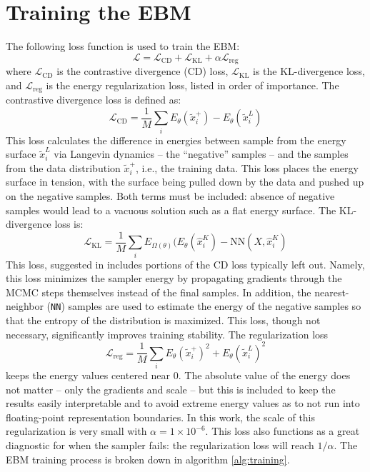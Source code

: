 \section{Training the EBM}
The following loss function is used to train the EBM:
\begin{equation}
	\mathcal{L} = \mathcal{L}_\text{CD} + \mathcal{L}_\text{KL} + \alpha \mathcal{L}_\text{reg}
\end{equation}
where $\mathcal{L}_\text{CD}$ is the contrastive divergence (CD) loss, $\mathcal{L}_\text{KL}$ is the KL-divergence loss, and $\mathcal{L}_\text{reg}$ is the energy regularization loss, listed in order of importance.
The contrastive divergence loss is defined as:
\begin{equation}
	\mathcal{L}_\text{CD} = \frac{1}{M} \sum_i E_\theta(\tilde{x}_{i}^+) - E_\theta(\tilde{x}_{i}^L)
\end{equation}
This loss calculates the difference in energies between sample from the energy surface $\tilde{x}_{i}^L$ via Langevin dynamics -- the ``negative'' samples -- and the samples from the data distribution $\tilde{x}_{i}^+$, i.e., the training data. This loss places the energy surface in tension, with the surface being pulled down by the data and pushed up on the negative samples. Both terms must be included: absence of negative samples would lead to a vacuous solution such as a flat energy surface.
The KL-divergence loss is:
\begin{equation}
	\mathcal{L}_\text{KL} = \frac{1}{M} \sum_i E_{\Omega(\theta)}(E_\theta(\hat{x}_{i}^K) - \text{NN}(X, \hat{x}_{i}^K)
\end{equation}
This loss, suggested in \cite{du_improved_2021} includes portions of the CD loss typically left out. Namely, this loss minimizes the sampler energy by propagating gradients through the MCMC steps themselves instead of the final samples. In addition, the nearest-neighbor (\texttt{NN}) samples are used to estimate the energy of the negative samples so that the entropy of the distribution is maximized. This loss, though not necessary, significantly improves training stability. 
The regularization loss
\begin{equation}
	\mathcal{L}_\text{reg} = \frac{1}{M} \sum_i E_\theta(\tilde{x}_{i}^+)^2 + E_\theta(\tilde{x}_{i}^L)^2
\end{equation}
keeps the energy values centered near 0. The absolute value of the energy does not matter -- only the gradients and scale -- but this  is included to keep the results easily interpretable and to avoid extreme energy values as to not run into floating-point representation boundaries. In this work, the scale of this regularization is very small with $\alpha = 1 \times 10^{-6}$. This loss also functions as a great diagnostic for when the sampler fails: the regularization loss will reach $1/\alpha$. The EBM training process is broken down in algorithm \ref{alg:training}.

